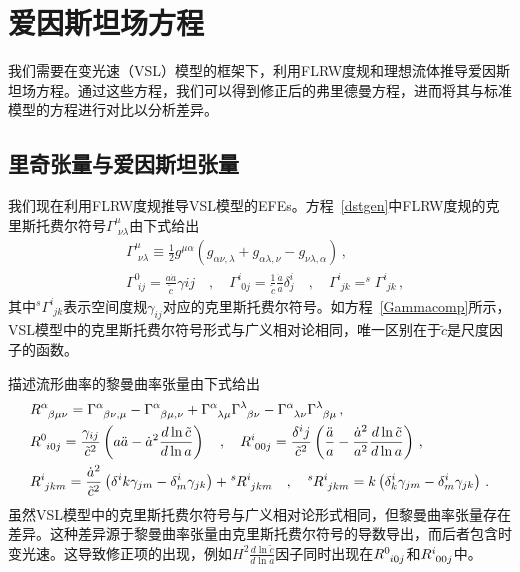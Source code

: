 \documentclass[jkps,preprint,fleqn]{revtex4}
\newcommand{\tc}{\tilde{c}}
\begin{document}
\section{爱因斯坦场方程} \label{sec:EFEs}

我们需要在变光速（VSL）模型的框架下，利用FLRW度规和理想流体推导爱因斯坦场方程。通过这些方程，我们可以得到修正后的弗里德曼方程，进而将其与标准模型的方程进行对比以分析差异。
\subsection{里奇张量与爱因斯坦张量}\label{subsec:RS}
我们现在利用FLRW度规\cite{Lee:2020zts,Lee:2025rpw}推导VSL模型的EFEs。方程~\eqref{dstgen}中FLRW度规的克里斯托费尔符号$\Gamma^{\mu}_{\,\,\nu\lambda}$由下式给出
\begin{align}
&\Gamma^{\mu}_{\,\,\nu\lambda} \equiv \frac{1}{2} g^{\mu\alpha} \left( g_{\alpha\nu,\lambda} + g_{\alpha\lambda,\nu} - g_{\nu\lambda,\alpha} \right) \label{Gamma}\,, \\ &\Gamma^{0}_{\,\,ij} = \frac{a\dot{a}}{\tc} \gamma{ij} \quad , \quad \Gamma^{i}_{\,\,0j} = \frac{1}{\tc}  \frac{\dot{a}}{a} \delta^i_j \quad , \quad \Gamma^{i}_{\,\,jk} = ^{s}\Gamma^{i}_{\,\,jk}  \label{Gammacomp} \,, \end{align}
其中$^{s}\Gamma^{i}_{\,\,jk}$表示空间度规$\gamma_{ij}$对应的克里斯托费尔符号。如方程~\eqref{Gammacomp}所示，VSL模型中的克里斯托费尔符号形式与广义相对论相同，唯一区别在于$\tc$是尺度因子的函数。

描述流形曲率的黎曼曲率张量由下式给出
\begin{align}
&\tensor{R}{^\alpha_\beta_\mu_\nu} = \tensor{\Gamma}{^\alpha_\beta_\nu_,_\mu} - \tensor{\Gamma}{^\alpha_\beta_\mu_,_\nu} + \tensor{\Gamma}{^\alpha_\lambda_\mu} \tensor{\Gamma}{^\lambda_\beta_\nu} - \tensor{\Gamma}{^\alpha_\lambda_\nu} \tensor{\Gamma}{^\lambda_\beta_\mu} \label{Rabmu} \,, \\ &\tensor{R}{^0_i_0_j} = \frac{\gamma_{ij}}{\tc^2} \left( a \ddot{a} - \dot{a}^2 \frac{d \ln \tc}{d \ln a} \right) \quad , \quad \tensor{R}{^i_0_0_j} = \frac{\delta^{i}{j}}{\tc^2} \left( \frac{\ddot{a}}{a} - \frac{\dot{a}^2}{a^2} \frac{d \ln \tc}{ d \ln a}  \right) \,, \label{R0i0j} \\ &\tensor{R}{^i_j_k_m} = \frac{\dot{a}^2}{\tc^2} \left( \delta^{i}{k} \gamma_{jm} - \delta^i_m \gamma_{jk} \right) + \tensor[^s]{R}{^i_j_k_m} \quad , \quad \tensor[^s]{R}{^i_j_k_m} = k \left( \delta^i_k \gamma_{jm} - \delta^i_m \gamma_{jk} \right) \,. \label{Rijkm} \end{align}
虽然VSL模型中的克里斯托费尔符号与广义相对论形式相同，但黎曼曲率张量存在差异。这种差异源于黎曼曲率张量由克里斯托费尔符号的导数导出，而后者包含时变光速。这导致修正项的出现，例如$H^2 \frac{d \ln \tc}{d \ln a}$因子同时出现在$\tensor{R}{^0_i_0_j}$和$\tensor{R}{^i_0_0_j}$中。
\end{document}
